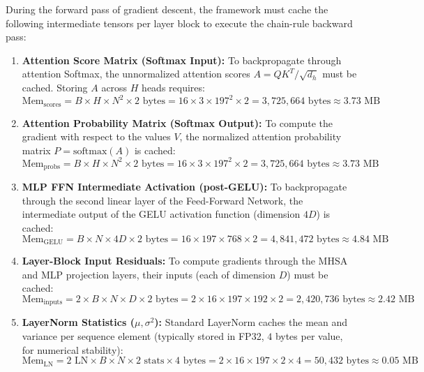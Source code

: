 During the forward pass of gradient descent, the framework must cache the following intermediate tensors per layer block to execute the chain-rule backward pass:
\begin{enumerate}
    \item \textbf{Attention Score Matrix (Softmax Input):} To backpropagate through attention Softmax, the unnormalized attention scores $A = QK^T / \sqrt{d_h}$ must be cached. Storing $A$ across $H$ heads requires:
    \begin{equation}
    \text{Mem}_{\text{scores}} = B \times H \times N^2 \times 2 \text{ bytes} = 16 \times 3 \times 197^2 \times 2 = 3,725,664 \text{ bytes} \approx 3.73 \text{ MB}
    \end{equation}
    \item \textbf{Attention Probability Matrix (Softmax Output):} To compute the gradient with respect to the values $V$, the normalized attention probability matrix $P = \text{softmax}(A)$ is cached:
    \begin{equation}
    \text{Mem}_{\text{probs}} = B \times H \times N^2 \times 2 \text{ bytes} = 16 \times 3 \times 197^2 \times 2 = 3,725,664 \text{ bytes} \approx 3.73 \text{ MB}
    \end{equation}
    \item \textbf{MLP FFN Intermediate Activation (post-GELU):} To backpropagate through the second linear layer of the Feed-Forward Network, the intermediate output of the GELU activation function (dimension $4D$) is cached:
    \begin{equation}
    \text{Mem}_{\text{GELU}} = B \times N \times 4D \times 2 \text{ bytes} = 16 \times 197 \times 768 \times 2 = 4,841,472 \text{ bytes} \approx 4.84 \text{ MB}
    \end{equation}
    \item \textbf{Layer-Block Input Residuals:} To compute gradients through the MHSA and MLP projection layers, their inputs (each of dimension $D$) must be cached:
    \begin{equation}
    \text{Mem}_{\text{inputs}} = 2 \times B \times N \times D \times 2 \text{ bytes} = 2 \times 16 \times 197 \times 192 \times 2 = 2,420,736 \text{ bytes} \approx 2.42 \text{ MB}
    \end{equation}
    \item \textbf{LayerNorm Statistics ($\mu, \sigma^2$):} Standard LayerNorm caches the mean and variance per sequence element (typically stored in FP32, $4$ bytes per value, for numerical stability):
    \begin{equation}
    \text{Mem}_{\text{LN}} = 2 \text{ LN} \times B \times N \times 2 \text{ stats} \times 4 \text{ bytes} = 2 \times 16 \times 197 \times 2 \times 4 = 50,432 \text{ bytes} \approx 0.05 \text{ MB}
    \end{equation}
\end{enumerate}
